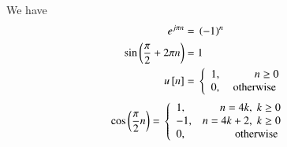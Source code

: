 \documentclass[journal,12pt,twocolumn]{IEEEtran}
\begin{document}
We have 
\begin{align}
\label{eq:2}
e^{j \pi n} ={}& \left(-1\right)^n\\
\label{eq:3}
\sin\left(\frac{\pi}{2}+2 \pi n\right) = {}& 1 \\
\label{eq:4}
u{}\left[n\right]={}& \left\{
  \begin{array}{lr} 
      1, & n\geq 0 \\
      0, & \text{ otherwise }
      \end{array}
\right.
\end{align}
\begin{align}
\label{eq:5}
\cos\left(\frac{\pi}{2} n\right) = {}& \left\{
  \begin{array}{lr} 
      1, & n = 4k,\; k\geq 0 \\
      -1, & n = 4k+2,\; k \geq 0 \\
      0, & \text{ otherwise }
      \end{array}
\right.
\end{align}
\end{document}
